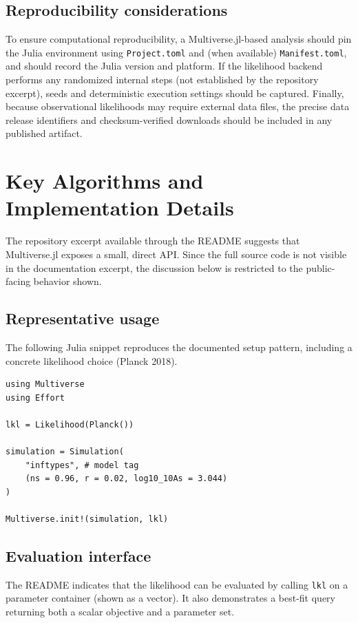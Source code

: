 \documentclass[11pt]{article}
\begin{document}
\subsection{Reproducibility considerations}
To ensure computational reproducibility, a Multiverse.jl-based analysis should pin the Julia environment using \texttt{Project.toml} and (when available) \texttt{Manifest.toml}, and should record the Julia version and platform.
If the likelihood backend performs any randomized internal steps (not established by the repository excerpt), seeds and deterministic execution settings should be captured.
Finally, because observational likelihoods may require external data files, the precise data release identifiers and checksum-verified downloads should be included in any published artifact.

\section{Key Algorithms and Implementation Details}
The repository excerpt available through the README suggests that Multiverse.jl exposes a small, direct API.
Since the full source code is not visible in the documentation excerpt, the discussion below is restricted to the public-facing behavior shown.

\subsection{Representative usage}
The following Julia snippet reproduces the documented setup pattern, including a concrete likelihood choice (Planck 2018).

\begin{lstlisting}
using Multiverse
using Effort

lkl = Likelihood(Planck())

simulation = Simulation(
    "inftypes", # model tag
    (ns = 0.96, r = 0.02, log10_10As = 3.044)
)

Multiverse.init!(simulation, lkl)
\end{lstlisting}

\subsection{Evaluation interface}
The README indicates that the likelihood can be evaluated by calling \texttt{lkl} on a parameter container (shown as a vector).
It also demonstrates a best-fit query returning both a scalar objective and a parameter set.
\end{document}
